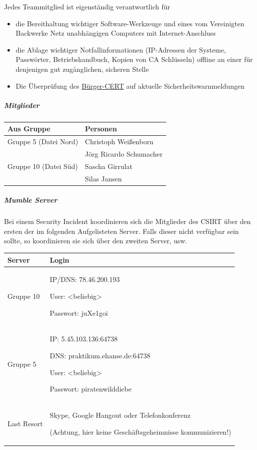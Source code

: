 \documentclass[]{article}
\let\oldsubparagraph\subparagraph
\renewcommand{\subparagraph}[1]{\oldsubparagraph{#1}\mbox{}}
\begin{document}
Jedes Teammitglied ist eigenständig verantwortlich für

\begin{itemize}
\item
  die Bereithaltung wichtiger Software-Werkzeuge und eines vom
  Vereinigten Backwerke Netz unabhängigen Computers mit
  Internet-Anschluss
\item
  die Ablage wichtiger Notfallinformationen (IP-Adressen der Systeme,
  Passwörter, Betriebshandbuch, Kopien von CA Schlüsseln) offline an
  einer für denjenigen gut zugänglichen, sicheren Stelle
\item
  Die Überprüfung des
  \href{https://www.buerger-cert.de/archive?type=WIDTechnicalWarning}{Bürger-CERT}
  auf aktuelle Sicherheitswarnmeldungen
\end{itemize}

\subparagraph{Mitglieder}\label{mitglieder}
\begin{longtable}{ll}
\toprule
Aus Gruppe & Personen\tabularnewline
\midrule
Gruppe 5 (Datei Nord) & Christoph Weißenborn\\
                      & Jörg Ricardo Schumacher\tabularnewline
Gruppe 10 (Datei Süd) & Sascha Girrulat\\
                      & Silas Jansen\tabularnewline
\bottomrule
\end{longtable}

\subparagraph{Mumble Server}\label{mumble-server}

Bei einem Security Incident koordinieren sich die Mitglieder des CSIRT
über den ersten der im folgenden Aufgelisteten Server. Falls dieser
nicht verfügbar sein sollte, so koordinieren sie sich über den zweiten
Server, usw.

\begin{longtable}{lp{6cm}}
\toprule
Server & Login\tabularnewline
\midrule
Gruppe 10 & IP/DNS: 78.46.200.193

User: \textless{}beliebig\textgreater{}

Passwort: juXe1goi\tabularnewline
Gruppe 5 & IP: 5.45.103.136:64738

DNS: praktikum.ehanse.de:64738

User: \textless{}beliebig\textgreater{}

Passwort: piratenwilddiebe\tabularnewline
Last Resort & Skype, Google Hangout oder Telefonkonferenz

(Achtung, hier keine Geschäftsgeheimnisse kommunizieren!)\tabularnewline
\bottomrule
\end{longtable}
\end{document}
